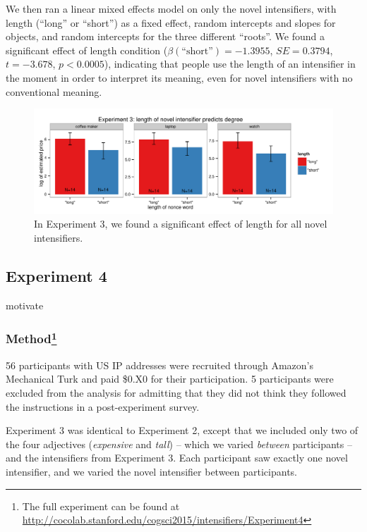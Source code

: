 \documentclass[10pt,letterpaper]{article}
\newcommand{\w}[1]{\emph{#1}}
\newcommand{\todo}[1]{{\color{red}#1}}
\begin{document}
We then ran a linear mixed effects model on only the novel intensifiers, with length (``long'' or ``short'') as a fixed effect, random intercepts and slopes for objects, and random intercepts for the three different ``roots''. We found a significant effect of length condition ($\beta(\mbox{``short''})=-1.3955$, $SE=0.3794$, $t=-3.678$, $p<0.0005$), indicating that people use the length of an intensifier in the moment in order to interpret its meaning, even for novel intensifiers with no conventional meaning.

\begin{figure}[hbt]
\begin{center}
\includegraphics[width=\textwidth]{free_response_nonce_intensifiers_length.pdf}
\end{center}
\caption{In Experiment 3, we found a significant effect of length for all novel intensifiers.} 
\label{exp3_novel}
\end{figure}

\subsection{Experiment 4}
\todo{motivate}

\subsubsection{Method\footnote{The full experiment can be found at \url{http://cocolab.stanford.edu/cogsci2015/intensifiers/Experiment4}}}
56 participants with US IP addresses were recruited through Amazon's Mechanical Turk and paid \$0.X0 for their participation. 5 participants were excluded from the analysis for admitting that they did not think they followed the instructions in a post-experiment survey.

Experiment 3 was identical to Experiment 2, except that we included only two of the four adjectives (\w{expensive} and \w{tall}) -- which we varied \emph{between} participants -- and the intensifiers from Experiment 3. Each participant saw exactly one novel intensifier, and we varied the novel intensifier between participants.
\end{document}

